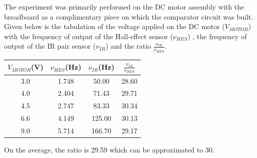 \documentclass[12pt]{article}
\begin{document}
The experiment was primarily performed on the DC motor assembly with the breadboard as a complimentary piece on which the comparator circuit was built. Given below is the tabulation of the voltage applied on the DC motor (\( V_{MOTOR} \)) with the frequency of output of the Hall-effect sensor (\( \nu_{HES} \)) , the frequency of output of the IR pair sensor (\( \nu_{IR} \)) and the ratio \( \frac{\nu_{IR}}{\nu_{HES}} \).
\begin{table}[h!]
\centering
\begin{tabular}{||c||c|c|c||}
\hline\hline
\( V_{MOTOR} \)(V) & \( \nu_{HES} \)(Hz) & \( \nu_{IR} \)(Hz) & \( \frac{\nu_{IR}}{\nu_{HES}} \)\\ [0.5ex]
\hline\hline
3.0 & 1.748 & 50.00 & 28.60\\
4.0 & 2.404 & 71.43 & 29.71\\
4.5 & 2.747 & 83.33 & 30.34\\
6.6 & 4.149 & 125.00 & 30.13\\
9.0 & 5.714 & 166.70 & 29.17\\ [1ex]
\hline\hline
\end{tabular}
\end{table}

On the average, the ratio is 29.59 which can be approximated to 30.\\
\end{document}
